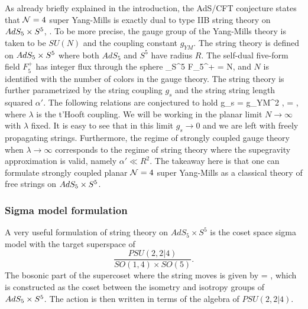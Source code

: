 As already briefly explained in the introduction, the AdS/CFT conjecture states that $\mathcal{N}=4$ super Yang-Mills is exactly dual to type IIB string theory on $AdS_5 \times S^5$, \cite{Maldacena:1997re,Gubser:1998bc,Witten:1998qj}. 
To be more precise, the gauge group of the Yang-Mills theory is taken to be $SU(N)$ and the coupling constant $g_{YM}$. 
The string theory is defined on $AdS_5 \times S^5$ where both $AdS_5$ and $S^5$ have radius $R$. 
The self-dual five-form field $F_5^+$ has integer flux through the sphere
\beq
	\int_{S^5} F_5^+ = N,
\eeq
and $N$ is identified with the number of colors in the gauge theory. 
The string theory is further parametrized by the string coupling $g_s$ and the string string length squared $\alpha'$. The following relations are conjectured to hold
\pi g_s = g_{YM}^2 \equiv {}, \;\;\;\;\;\;\;  = \lambda,
\eeq
where $\lambda$ is the t'Hooft coupling. We will be working in the planar limit $N \rightarrow \infty$ with $\lambda$ fixed. 
It is easy to see that in this limit $g_s \rightarrow 0$ and we are left with freely propagating strings.
Furthermore, the regime of strongly coupled gauge theory when $\lambda \rightarrow \infty$ corresponds to the regime of string theory where the supegravity approximation is valid, namely $\alpha' \ll R^2$.
The takeaway here is that one can formulate strongly coupled planar $\mathcal{N}=4$ super Yang-Mills as a classical theory of free strings on $AdS_5 \times S^5$.


\subsubsection{Sigma model formulation}

A very useful formulation of string theory on $AdS_5 \times S^5$ is the coset space sigma model \cite{Metsaev:1998it} with the target superspace of
\begin{equation}
	\frac{PSU(2,2|4)}{SO(1,4) \times SO(5)}.
\end{equation}
\vspace{2pt}
The bosonic part of the supercoset where the string moves is given by
\beq
	 = \adsfive,
\eeq
which is constructed as the coset between the isometry and isotropy groups of $AdS_5 \times S^5$. 
The action is then written in terms of the algebra of $PSU(2,2|4)$.

